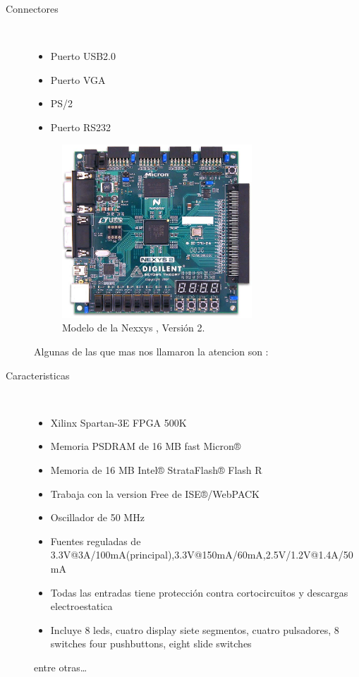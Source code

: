 \documentclass[paper=a4, fontsize=12pt]{article} 		%
\numberwithin{equation}{section}						%
\numberwithin{figure}{section} 							%
\numberwithin{table}{section} 							%
\begin{document}
\begin{description}
  \item[Connectores] \hfill \\
  	\begin{itemize}
		\item Puerto USB2.0
	    \item Puerto VGA
		\item PS/2
	    \item Puerto RS232
    \end{itemize}
\begin{figure}[!ht]
 \centering
   \includegraphics[width=0.7\textwidth]{model}
 \caption{Modelo de la Nexxys , Versión 2.}
    \label{fig:btn}
\end{figure}
  
 Algunas de las que mas nos llamaron la atencion son :
  \item[Caracteristicas] \hfill \\
    	\begin{itemize}
			\item Xilinx Spartan-3E FPGA 500K
			\item Memoria PSDRAM de 16 MB fast Micron® 
			\item Memoria de 16 MB Intel® StrataFlash® Flash R 
      		\item Trabaja con la version Free de ISE®/WebPACK 
            \item Oscillador de 50 MHz
			\item Fuentes reguladas de 3.3V@3A/100mA(principal),3.3V@150mA/60mA,2.5V/1.2V@1.4A/50mA
            \item Todas las entradas tiene protección contra cortocircuitos y descargas electroestatica
  			\item Incluye  8 leds, cuatro display siete segmentos, cuatro pulsadores, 8 switches four pushbuttons, eight slide switches
      \end{itemize}
      entre otras\ldots
\end{description}
\end{document}
